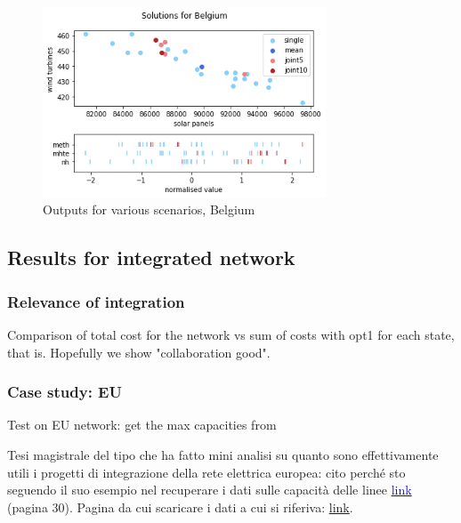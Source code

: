 \documentclass[english]{article}
\numberwithin{definition}{section}
\numberwithin{theorem}{section}
\numberwithin{problem}{section}
\begin{document}
\begin{figure}[H]
\centering
\includegraphics[width=0.75\textwidth]{immagini/Single_node/sols_BE.png}
\caption{Outputs for various scenarios, Belgium}
\label{fig: sols_BE}
\end{figure}




\subsection{Results for integrated network}
\subsubsection{Relevance of integration}
Comparison of total cost for the network vs sum of costs with opt1 for each state, that is. Hopefully we show "collaboration good".

\subsubsection{Case study: EU}
Test on EU network: get the max capacities from 

Tesi magistrale del tipo che ha fatto mini analisi su quanto sono effettivamente utili i progetti di integrazione della rete elettrica europea: cito perché sto seguendo il suo esempio nel recuperare i dati sulle capacità delle linee
\hyperlink{https://www.diva-portal.org/smash/get/diva2:1476768/FULLTEXT01.pdf}{\textcolor{blue}{link}} (pagina 30). Pagina da cui scaricare i dati a cui si riferiva:
\hyperlink{https://transparency.entsoe.eu/transmission-domain/physicalFlow/show?name=&defaultValue=false&viewType=TABLE&areaType=BORDER_CTY&atch=false&dateTime.dateTime=22.07.2024+00:00|CET|DAY&border.values=CTY|10YGR-HTSO-----Y!CTY_CTY|10YGR-HTSO-----Y_CTY_CTY|10YIT-GRTN-----B&dateTime.timezone=CET_CEST&dateTime.timezone_input=CET+(UTC+1)+/+CEST+(UTC+2)}{link}.
\end{document}
